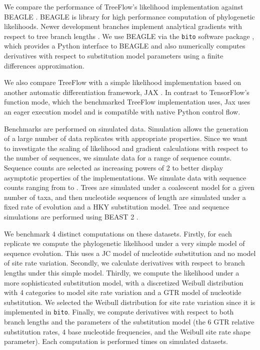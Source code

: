 We compare the performance of TreeFlow's likelihood implementation against BEAGLE \cite{ayres2019beagle}. BEAGLE is library for high performance computation of phylogenetic likelihoods. Newer development branches implement analytical gradients with respect to tree branch lengths \cite{ji2020gradients}. We use BEAGLE via the \texttt{bito} software package \cite{bito}, which provides a Python interface to BEAGLE and also numerically computes derivatives with respect to substitution model parameters using a finite differences approximation.

We also compare TreeFlow with a simple likelihood implementation based on another automatic differentiation framework, JAX \cite{jax2018github}. In contrast to TensorFlow's function mode, which the benchmarked TreeFlow implementation uses, Jax uses an eager execution model and is compatible with native Python control flow.

Benchmarks are performed on simulated data. Simulation allows the generation of a large number of data replicates with appropriate properties. Since we want to investigate the scaling of likelihood and gradient calculations with respect to the number of sequences, we simulate data for a range of sequence counts. Sequence counts are selected as increasing powers of 2 to better display asymptotic properties of the implementations. We simulate data with sequence counts ranging from  to . Trees are simulated under a coalescent model for a given number of taxa, and then nucleotide sequences of length  are simulated under a fixed rate of evolution and a HKY substitution model. Tree and sequence simulations are performed using BEAST 2 \cite{bouckaert2019beast}.

We benchmark 4 distinct computations on these datasets. Firstly, for each replicate we compute the phylogenetic likelihood under a very simple model of sequence evolution. This uses a JC model of nucleotide substitution and no model of site rate variation. Secondly, we calculate derivatives with respect to branch lengths under this simple model. Thirdly, we compute the likelihood under a more sophisticated substitution model, with a discretized Weibull distribution with 4 categories to model site rate variation and a GTR model of nucleotide substitution. We selected the Weibull distribution for site rate variation since it is implemented in \texttt{bito}. Finally, we compute derivatives with respect to both branch lengths and the parameters of the substitution model (the 6 GTR relative substitution rates, 4 base nucleotide frequencies, and the Weibull site rate shape parameter). Each computation is performed  times on  simulated datasets.


